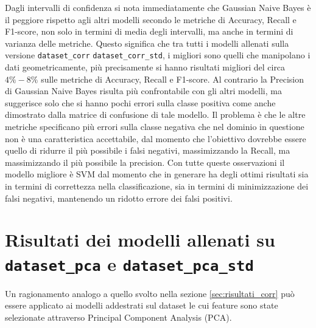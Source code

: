 Dagli intervalli di confidenza si nota immediatamente che Gaussian Naive Bayes è
il peggiore rispetto agli altri modelli secondo le metriche di Accuracy, Recall
e F1-score, non solo in termini di media degli intervalli, ma anche in termini
di varianza delle metriche. Questo significa che tra tutti i modelli allenati
sulla versione \texttt{dataset\_corr} \texttt{dataset\_corr\_std}, i migliori
sono quelli che manipolano i dati geometricamente, più precisamente si hanno
risultati migliori del circa $4\%-8\%$ sulle metriche di Accuracy, Recall e
F1-score. Al contrario la Precision di Gaussian Naive Bayes risulta più
confrontabile con gli altri modelli, ma suggerisce solo che si hanno pochi
errori sulla classe positiva come anche dimostrato dalla matrice di confusione
di tale modello. Il problema è che le altre metriche specificano più errori
sulla classe negativa che nel dominio in questione non è una caratteristica
accettabile, dal momento che l'obiettivo dovrebbe essere quello di ridurre il
più possibile i falsi negativi, massimizzando la Recall, ma massimizzando il più
possibile la precision. Con tutte queste osservazioni il modello migliore è SVM
dal momento che in generare ha degli ottimi risultati sia in termini di
correttezza nella classificazione, sia in termini di minimizzazione dei falsi
negativi, mantenendo un ridotto errore dei falsi positivi.
\section{Risultati dei modelli allenati su \texttt{dataset\_pca} e
  \texttt{dataset\_pca\_std}} \label{sec:risultati_pca}
Un ragionamento analogo a quello svolto nella sezione \ref{sec:risultati_corr}
può essere applicato ai modelli addestrati sul dataset le cui feature sono state
selezionate attraverso Principal Component Analysis (PCA).

